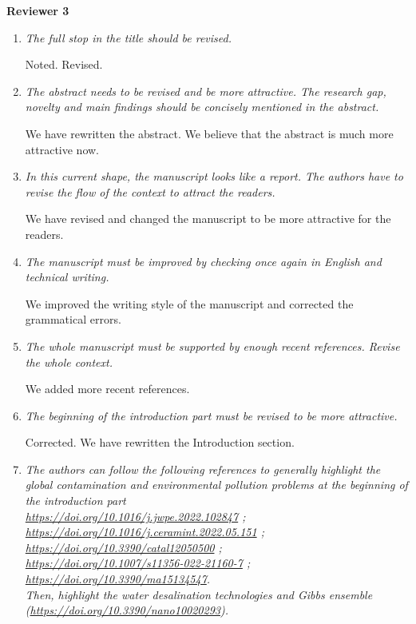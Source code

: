 \documentclass[12pt]{dinbrief}
\date{\today}
\begin{document}
\textbf{Reviewer 3}

\textit{}
\begin{enumerate}
\item \textit{The full stop in the title should be revised.}

Noted. Revised.
\item \textit{The abstract needs to be revised and be more attractive. The research gap, novelty and main findings should be concisely mentioned in the abstract.}

We have rewritten the abstract. We believe that the abstract is much more attractive now.
\item \textit{In this current shape, the manuscript looks like a report. The authors have to revise the flow of the context to attract the readers.}

We have revised and changed the manuscript to be more attractive for the readers. 
\item \textit{The manuscript must be improved by checking once again in English and technical writing. }

We improved the writing style of the manuscript and corrected the grammatical errors.

\item \textit{The whole manuscript must be supported by enough recent references. Revise the whole context.}

We added more recent references.
\item \textit{The beginning of the introduction part must be revised to be more attractive.}

Corrected. We have rewritten the Introduction section.
\item \textit{The authors can follow the following references to generally highlight the global contamination and environmental pollution problems at the beginning of the introduction part \\ \href{https://doi.org/10.1016/j.jwpe.2022.102847}{https://doi.org/10.1016/j.jwpe.2022.102847} ;\\
\href{https://doi.org/10.1016/j.ceramint.2022.05.151}{https://doi.org/10.1016/j.ceramint.2022.05.151} ;\\
\href{https://doi.org/10.3390/catal12050500}{https://doi.org/10.3390/catal12050500} ; \\
\href{https://doi.org/10.1007/s11356-022-21160-7}{https://doi.org/10.1007/s11356-022-21160-7} ;\\
\href{https://doi.org/10.3390/ma15134547}{https://doi.org/10.3390/ma15134547}. \\
Then, highlight the water desalination technologies and Gibbs ensemble\\
(\href{https://doi.org/10.3390/nano10020293}{https://doi.org/10.3390/nano10020293}).}


\end{enumerate}
\end{document}
